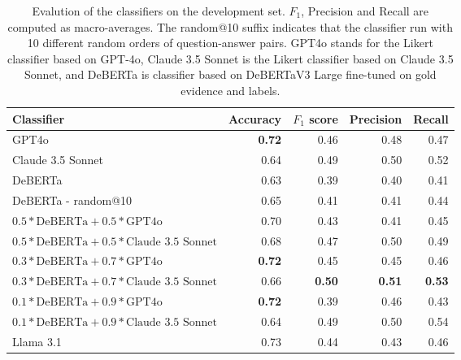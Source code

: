 \begin{table*}
    \centering
    \begin{tabular}{lrrrr}
        \toprule
        Classifier & Accuracy & $F_1$ score & Precision & Recall \\
        \midrule
        GPT4o & \textbf{0.72} & 0.46 & 0.48 & 0.47 \\
        Claude 3.5 Sonnet & 0.64 & 0.49 & 0.50 & 0.52 \\
        DeBERTa & 0.63 & 0.39 & 0.40 & 0.41 \\
        DeBERTa - random@10 & 0.65 & 0.41 & 0.41 & 0.44 \\
        $0.5*\mbox{DeBERTa}+0.5*\mbox{GPT4o}$ & 0.70 & 0.43 & 0.41 & 0.45 \\
        $0.5*\mbox{DeBERTa}+0.5*\mbox{Claude 3.5 Sonnet}$ & 0.68 & 0.47 & 0.50 & 0.49 \\
        $0.3*\mbox{DeBERTa}+0.7*\mbox{GPT4o}$ & \textbf{0.72} & 0.45 & 0.45 & 0.46 \\
        $0.3*\mbox{DeBERTa}+0.7*\mbox{Claude 3.5 Sonnet}$ & 0.66 & \textbf{0.50} & \textbf{0.51} & \textbf{0.53} \\
        $0.1*\mbox{DeBERTa}+0.9*\mbox{GPT4o}$ & \textbf{0.72} & 0.39 & 0.46 & 0.43 \\
        $0.1*\mbox{DeBERTa}+0.9*\mbox{Claude 3.5 Sonnet}$ & 0.64 & 0.49 & 0.50 & 0.54 \\
        \midrule
        Llama 3.1 & 0.73 & 0.44 & 0.43 & 0.46 \\
        \bottomrule
    \end{tabular} 
    \caption{Evalution of the classifiers on the development set. $F_1$, Precision and Recall are computed as macro-averages. The random@10 suffix indicates that the classifier run with 10 different random orders of question-answer pairs. GPT4o stands for the Likert classifier based on GPT-4o, Claude 3.5 Sonnet is the Likert classifier based on Claude 3.5 Sonnet, and DeBERTa is classifier based on DeBERTaV3 Large fine-tuned on \averitec{} gold evidence and labels.}
    \label{tab:nli}
\end{table*}